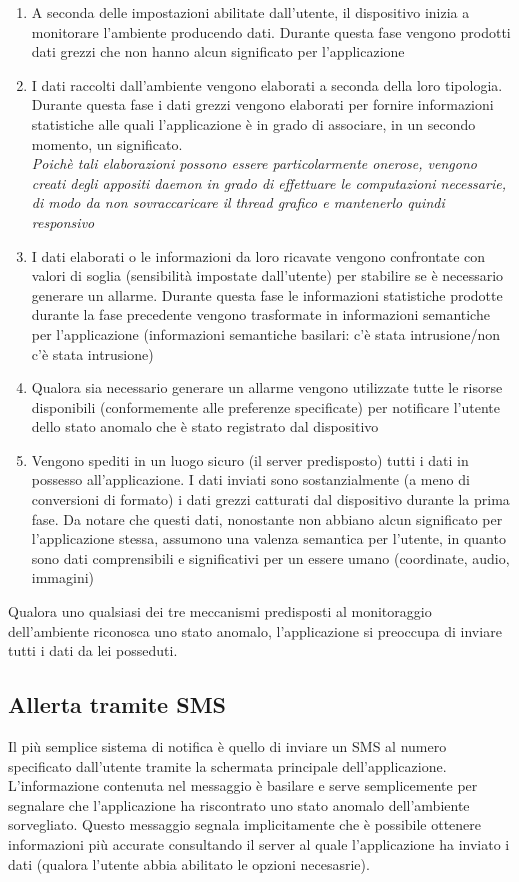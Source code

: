 \begin{enumerate}
  \item A seconda delle impostazioni abilitate dall'utente, il dispositivo inizia a monitorare l'ambiente producendo dati. Durante questa fase vengono prodotti dati grezzi che non hanno alcun significato per l'applicazione
  \item I dati raccolti dall'ambiente vengono elaborati a seconda della loro tipologia. Durante questa fase i dati grezzi vengono elaborati per fornire informazioni statistiche alle quali l'applicazione è in grado di associare, in un secondo momento, un significato.\\
  \textit{Poichè tali elaborazioni possono essere particolarmente onerose, vengono creati degli appositi daemon in grado di effettuare le computazioni necessarie, di modo da non sovraccaricare il thread grafico e mantenerlo quindi responsivo}
  \item I dati elaborati o le informazioni da loro ricavate vengono confrontate con valori di soglia (sensibilità impostate dall'utente) per stabilire se è necessario generare un allarme. Durante questa fase le informazioni statistiche prodotte durante la fase precedente vengono trasformate in informazioni semantiche per l'applicazione (informazioni semantiche basilari: c'è stata intrusione/non c'è stata intrusione)
  \item Qualora sia necessario generare un allarme vengono utilizzate tutte le risorse disponibili (conformemente alle preferenze specificate) per notificare l'utente dello stato anomalo che è stato registrato dal dispositivo
  \item Vengono spediti in un luogo sicuro (il server predisposto) tutti i dati in possesso all'applicazione. I dati inviati sono sostanzialmente (a meno di conversioni di formato) i dati grezzi catturati dal dispositivo durante la prima fase. Da notare che questi dati, nonostante non abbiano alcun significato per l'applicazione stessa, assumono una valenza semantica per l'utente, in quanto sono dati comprensibili e significativi per un essere umano (coordinate, audio, immagini)
\end{enumerate}
Qualora uno qualsiasi dei tre meccanismi predisposti al monitoraggio dell'ambiente riconosca uno stato anomalo, l'applicazione si preoccupa di inviare tutti i dati da lei posseduti.

\subsection{Allerta tramite SMS}
Il più semplice sistema di notifica è quello di inviare un SMS al numero specificato dall'utente tramite la schermata principale dell'applicazione.\\
L'informazione contenuta nel messaggio è basilare e serve semplicemente per segnalare che l'applicazione ha riscontrato uno stato anomalo dell'ambiente sorvegliato. Questo messaggio segnala implicitamente che è possibile ottenere informazioni più accurate consultando il server al quale l'applicazione ha inviato i dati (qualora l'utente abbia abilitato le opzioni necesasrie).

